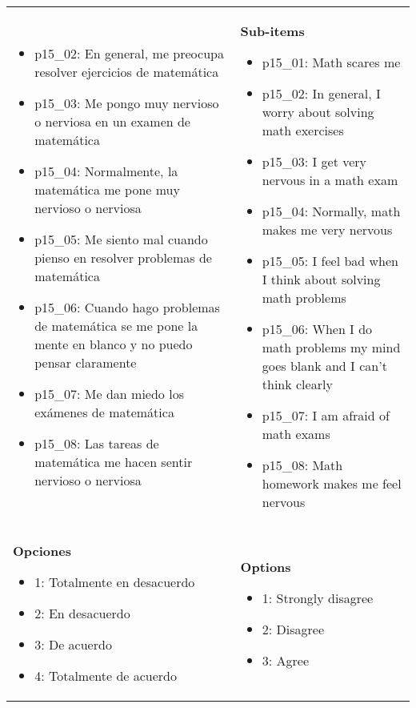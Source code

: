 \documentclass[11pt]{article}
\begin{document}
\begin{longtable}{@{}LL@{}}
\begin{itemize}[leftmargin=*]
\item p15\_02: En general, me preocupa resolver ejercicios de matemática
\item p15\_03: Me pongo muy nervioso o nerviosa en un examen de matemática
\item p15\_04: Normalmente, la matemática me pone muy nervioso o nerviosa
\item p15\_05: Me siento mal cuando pienso en resolver problemas de matemática
\item p15\_06: Cuando hago problemas de matemática se me pone la mente en blanco y no puedo pensar claramente
\item p15\_07: Me dan miedo los exámenes de matemática
\item p15\_08: Las tareas de matemática me hacen sentir nervioso o nerviosa\end{itemize} & \textbf{Sub-items}\par\begin{itemize}[leftmargin=*]\item p15\_01: Math scares me
\item p15\_02: In general, I worry about solving math exercises
\item p15\_03: I get very nervous in a math exam
\item p15\_04: Normally, math makes me very nervous
\item p15\_05: I feel bad when I think about solving math problems
\item p15\_06: When I do math problems my mind goes blank and I can't think clearly
\item p15\_07: I am afraid of math exams
\item p15\_08: Math homework makes me feel nervous\end{itemize} \\
\textbf{Opciones}\par\begin{itemize}[leftmargin=*]\item 1: Totalmente en desacuerdo
\item 2: En desacuerdo
\item 3: De acuerdo
\item 4: Totalmente de acuerdo\end{itemize} & \textbf{Options}\par\begin{itemize}[leftmargin=*]\item 1: Strongly disagree
\item 2: Disagree
\item 3: Agree

\end{itemize}
\end{longtable}
\end{document}
